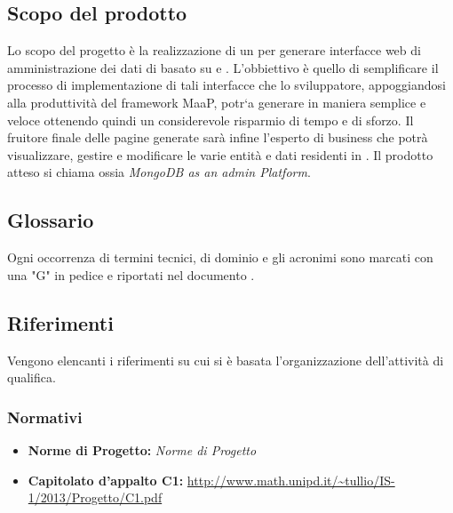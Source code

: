\subsection{Scopo del prodotto}
Lo scopo del progetto è la realizzazione di un  per generare interfacce web di amministrazione dei dati di  basato su   e . L'obbiettivo è quello di semplificare il processo di implementazione di tali interfacce che lo sviluppatore, appoggiandosi alla produttività del framework MaaP, potr`a generare in maniera semplice e veloce ottenendo quindi un considerevole risparmio di tempo e di sforzo. Il fruitore finale delle pagine generate sarà infine l'esperto di business che potrà visualizzare, gestire e modificare le varie entità e dati residenti in .
Il prodotto atteso si chiama  ossia \emph{MongoDB as an admin Platform}. 

\subsection{Glossario}
Ogni occorrenza di termini tecnici, di dominio e gli acronimi sono marcati con una "G" in pedice e riportati nel documento \Glossario{}.

\subsection{Riferimenti}
Vengono elencanti i riferimenti su cui si è basata l'organizzazione dell'attività di qualifica.
	\subsubsection{Normativi}
		\begin{itemize}
  			\item \textbf{Norme di Progetto:}  \emph{Norme di Progetto}
			\item \textbf{Capitolato d'appalto C1:} \url{http://www.math.unipd.it/~tullio/IS-1/2013/Progetto/C1.pdf}
		\end{itemize}
